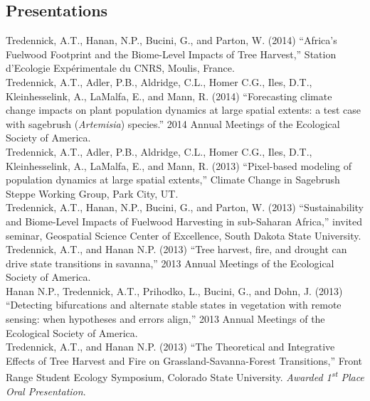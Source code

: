 \documentclass[margin,line]{resume}
\begin{document}
\begin{resume}
    \section{\mysidestyle Presentations}
    Tredennick, A.T., Hanan, N.P., Bucini, G., and Parton, W. (2014) ``Africa's Fuelwood Footprint and the Biome-Level Impacts of Tree Harvest,'' Station d'Ecologie Exp\'{e}rimentale du CNRS, Moulis, France. \vspace{-6mm}\\%
    
    Tredennick, A.T., Adler, P.B., Aldridge, C.L., Homer C.G., Iles, D.T., Kleinhesselink, A., LaMalfa, E., and Mann, R. (2014) ``Forecasting climate change impacts on plant population dynamics at large spatial extents: a test case with sagebrush (\emph{Artemisia}) species.'' 2014 Annual Meetings of the Ecological Society of America.\vspace{-6mm}\\%
    
    Tredennick, A.T., Adler, P.B., Aldridge, C.L., Homer C.G., Iles, D.T., Kleinhesselink, A., LaMalfa, E., and Mann, R. (2013) ``Pixel-based modeling of population dynamics at large spatial extents,'' Climate Change in Sagebrush Steppe Working Group, Park City, UT. \vspace{-6mm}\\%
    
    Tredennick, A.T., Hanan, N.P., Bucini, G., and Parton, W. (2013) ``Sustainability and Biome-Level Impacts of Fuelwood Harvesting in sub-Saharan Africa,'' invited seminar, Geospatial Science Center of Excellence, South Dakota State University. \vspace{-6mm}\\%
    
    Tredennick, A.T., and Hanan N.P. (2013) ``Tree harvest, fire, and drought can drive state transitions in savanna,'' 2013 Annual Meetings of the Ecological Society of America. \vspace{-6mm}\\%
    
    Hanan N.P., Tredennick, A.T., Prihodko, L., Bucini, G., and Dohn, J. (2013) ``Detecting bifurcations and alternate stable states in vegetation with remote sensing: when hypotheses and errors align,'' 2013 Annual Meetings of the Ecological Society of America. \vspace{-6mm}\\%
    
    Tredennick, A.T., and Hanan N.P. (2013) ``The Theoretical and Integrative Effects of Tree Harvest and Fire on Grassland-Savanna-Forest Transitions,'' Front Range Student Ecology Symposium, Colorado State University. \textsl{Awarded 1\textsuperscript{st} Place Oral Presentation}. \vspace{-6mm}\\%
    

\end{resume}
\end{document}
